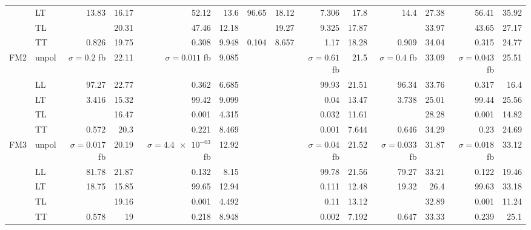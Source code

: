 \begin{table}[h]
{\begin{tabular}{llrrrrrrrrrrrr}
 & LT & \num{13.83} & \num{16.17} & \num{52.12} & \num{13.6} & \num{96.65} & \num{18.12} & \num{7.306} & \num{17.8} & \num{14.4} & \num{27.38} & \num{56.41} & \num{35.92} \\
 & TL &  & \num{20.31} & \num{47.46} & \num{12.18} &  & \num{19.27} & \num{9.325} & \num{17.87} &  & \num{33.97} & \num{43.65} & \num{27.17} \\
 & TT & \num{0.826} & \num{19.75} & \num{0.308} & \num{9.948} & \num{0.104} & \num{8.657} & \num{1.17} & \num{18.28} & \num{0.909} & \num{34.04} & \num{0.315} & \num{24.77} \\
\midrule
\multirow{5}{*}{FM2}
 & unpol & $\sigma = \num{0.2}$ fb & \num{22.11} & $\sigma = \num{0.011}$ fb & \num{9.085} &  &  & $\sigma = \num{0.61}$ fb & \num{21.5} & $\sigma = \num{0.4}$ fb & \num{33.09} & $\sigma = \num{0.043}$ fb & \num{25.51} \\
 & LL & \num{97.27} & \num{22.77} & \num{0.362} & \num{6.685} &  &  & \num{99.93} & \num{21.51} & \num{96.34} & \num{33.76} & \num{0.317} & \num{16.4} \\
 & LT & \num{3.416} & \num{15.32} & \num{99.42} & \num{9.099} &  &  & \num{0.04} & \num{13.47} & \num{3.738} & \num{25.01} & \num{99.44} & \num{25.56} \\
 & TL &  & \num{16.47} & \num{0.001} & \num{4.315} &  &  & \num{0.032} & \num{11.61} &  & \num{28.28} & \num{0.001} & \num{14.82} \\
 & TT & \num{0.572} & \num{20.3} & \num{0.221} & \num{8.469} &  &  & \num{0.001} & \num{7.644} & \num{0.646} & \num{34.29} & \num{0.23} & \num{24.69} \\
\midrule
\multirow{5}{*}{FM3}
 & unpol & $\sigma = \num{0.017}$ fb & \num{20.19} & $\sigma = \num{4.4e-03}$ fb & \num{12.92} &  &  & $\sigma = \num{0.04}$ fb & \num{21.52} & $\sigma = \num{0.033}$ fb & \num{31.87} & $\sigma = \num{0.018}$ fb & \num{33.12} \\
 & LL & \num{81.78} & \num{21.87} & \num{0.132} & \num{8.15} &  &  & \num{99.78} & \num{21.56} & \num{79.27} & \num{33.21} & \num{0.122} & \num{19.46} \\
 & LT & \num{18.75} & \num{15.85} & \num{99.65} & \num{12.94} &  &  & \num{0.111} & \num{12.48} & \num{19.32} & \num{26.4} & \num{99.63} & \num{33.18} \\
 & TL &  & \num{19.16} & \num{0.001} & \num{4.492} &  &  & \num{0.11} & \num{13.12} &  & \num{32.89} & \num{0.001} & \num{11.24} \\
 & TT & \num{0.578} & \num{19} & \num{0.218} & \num{8.948} &  &  & \num{0.002} & \num{7.192} & \num{0.647} & \num{33.33} & \num{0.239} & \num{25.1} \\

\end{tabular}}
\end{table}
